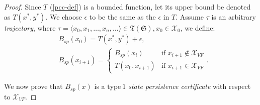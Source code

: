 \documentclass[acmlarge]{acmart}
\begin{document}
\begin{proof}
  Since \( T \) (\ref{pcc-def}) is a bounded function, let its upper bound be denoted as \( T(x^*, y^*) \). 
  We choose \( \epsilon \) to be the same as the \( \epsilon \) in \( T \). 
  Assume \( \tau \) is an arbitrary \emph{trajectory}, where $\tau =\langle x_0, x_1, \dots, x_n, \dots \rangle \in \mathfrak{T}(\mathfrak{S}), x_0 \in \mathcal{X}_0$,
  we define:
\begin{align}
  & B_{sp}(x_0) = T(x^*, y^*) + \epsilon, \\
  & B_{sp}(x_{i+1}) = \begin{cases}
  B_{sp}(x_i) & \text{if } x_{i+1} \notin \mathcal{X}_{VF} \\
  T(x_0, x_{i+1}) & \text{if } x_{i+1} \in \mathcal{X}_{VF}
  \end{cases}.
\end{align}

We now prove that \( B_{sp}(x) \) is a \emph{$\mathrm{type~1}$ state persistence certificate} with respect to $\mathcal{X}_{VF}$.


\end{proof}
\end{document}

